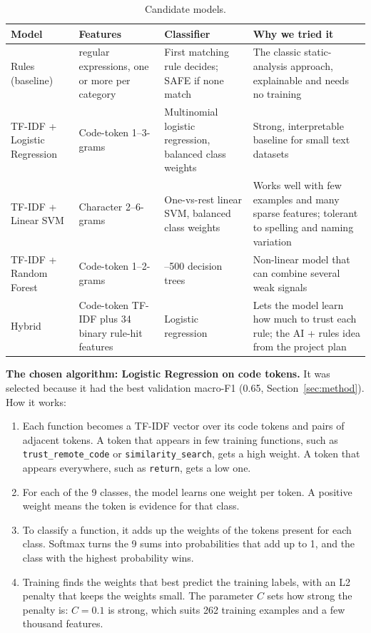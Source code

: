 \documentclass[11pt,a4paper]{article}
\newcommand{\code}[1]{\texttt{#1}}
\begin{document}
\begin{table}[H]
\centering\small
\begin{tabularx}{\linewidth}{>{\raggedright\arraybackslash}p{2.6cm} >{\raggedright\arraybackslash}p{3.2cm} >{\raggedright\arraybackslash}p{3.6cm} >{\raggedright\arraybackslash}X}
\toprule
Model & Features & Classifier & Why we tried it \\
\midrule
Rules (baseline) & 34 regular expressions, one or more per category & First matching rule decides; SAFE if none match & The classic static-analysis approach, explainable and needs no training \\
TF-IDF + Logistic Regression & Code-token 1--3-grams & Multinomial logistic regression, balanced class weights & Strong, interpretable baseline for small text datasets \\
TF-IDF + Linear SVM & Character 2--6-grams & One-vs-rest linear SVM, balanced class weights & Works well with few examples and many sparse features; tolerant to spelling and naming variation \\
TF-IDF + Random Forest & Code-token 1--2-grams & 100--500 decision trees & Non-linear model that can combine several weak signals \\
Hybrid & Code-token TF-IDF plus 34 binary rule-hit features & Logistic regression & Lets the model learn how much to trust each rule; the AI + rules idea from the project plan \\
\bottomrule
\end{tabularx}
\caption{Candidate models.}
\label{tab:models}
\end{table}

\textbf{The chosen algorithm: Logistic Regression on code tokens.} It was selected because
it had the best validation macro-F1 (0.65, Section~\ref{sec:method}). How it works:
\begin{enumerate}
  \item Each function becomes a TF-IDF vector over its code tokens and pairs of adjacent
        tokens. A token that appears in few training functions, such as
        \code{trust\_remote\_code} or \code{similarity\_search}, gets a high weight. A
        token that appears everywhere, such as \code{return}, gets a low one.
  \item For each of the 9 classes, the model learns one weight per token. A positive
        weight means the token is evidence for that class.
  \item To classify a function, it adds up the weights of the tokens present for each
        class. Softmax turns the 9 sums into probabilities that add up to 1, and the
        class with the highest probability wins.
  \item Training finds the weights that best predict the training labels, with an L2
        penalty that keeps the weights small. The parameter $C$ sets how strong the
        penalty is: $C = 0.1$ is strong, which suits 262 training examples and a few
        thousand features.
\end{enumerate}
\end{document}
